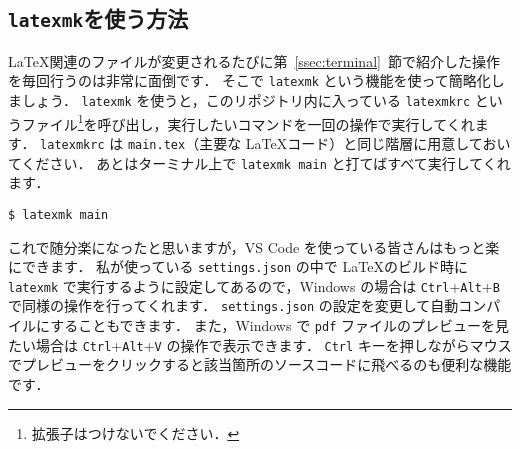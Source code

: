 \subsection{\texttt{latexmk}を使う方法}
\label{ssec:latexmk}

\LaTeX 関連のファイルが変更されるたびに第~\ref{ssec:terminal}~節で紹介した操作を毎回行うのは非常に面倒です．
そこで \verb|latexmk| という機能を使って簡略化しましょう．
\verb|latexmk| を使うと，このリポジトリ内に入っている \verb|latexmkrc| というファイル\footnote{拡張子はつけないでください．}を呼び出し，実行したいコマンドを一回の操作で実行してくれます．
\verb|latexmkrc| は \verb|main.tex|（主要な \LaTeX コード）と同じ階層に用意しておいてください．
あとはターミナル上で \verb|latexmk main| と打てばすべて実行してくれます．

\begin{tcolorbox}[title={\texttt{latexmk} を使用}, colback=red!5!white, colframe=red!75!black]
\begin{verbatim}
$ latexmk main
\end{verbatim}
\end{tcolorbox}

これで随分楽になったと思いますが，VS Code を使っている皆さんはもっと楽にできます．
私が使っている \verb|settings.json| の中で \LaTeX のビルド時に \verb|latexmk| で実行するように設定してあるので，Windows の場合は \verb|Ctrl|+\verb|Alt|+\verb|B| で同様の操作を行ってくれます．
\verb|settings.json| の設定を変更して自動コンパイルにすることもできます．
また，Windows で \verb|pdf| ファイルのプレビューを見たい場合は \verb|Ctrl|+\verb|Alt|+\verb|V| の操作で表示できます．
\verb|Ctrl| キーを押しながらマウスでプレビューをクリックすると該当箇所のソースコードに飛べるのも便利な機能です．






